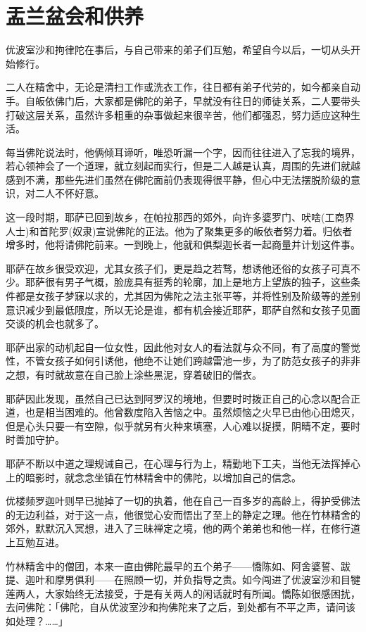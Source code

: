 \documentclass[12pt,twoside,openany]{book}
\begin{document}
\section{盂兰盆会和供养}\label{sec3.16}

优波室沙和拘律陀在事后，与自己带来的弟子们互勉，希望自今以后，一切从头开始修行。

二人在精舍中，无论是清扫工作或洗衣工作，往日都有弟子代劳的，如今都亲自动手。自皈依佛门后，大家都是佛陀的弟子，早就没有往日的师徒关系，二人要带头打破这层关系，虽然许多粗重的杂事做起来很辛苦，他们都强忍，努力适应这种生活。

每当佛陀说法时，他俩倾耳谛听，唯恐听漏一个字，因而往往进入了忘我的境界，若心领神会了一个道理，就立刻起而实行，但是二人越是认真，周围的先进们就越感到不满，那些先进们虽然在佛陀面前仍表现得很平静，但心中无法摆脱阶级的意识，对二人不怀好意。

这一段时期，耶萨已回到故乡，在帕拉那西的郊外，向许多婆罗门、吠啥(工商界人士)和首陀罗(奴隶)宣说佛陀的正法。他为了聚集更多的皈依者努力着。归依者增多时，他将请佛陀前来。一到晚上，他就和俱梨迦长者一起商量并计划这件事。

耶萨在故乡很受欢迎，尤其女孩子们，更是趋之若骛，想诱他还俗的女孩子可真不少。耶萨很有男子气概，脸庞具有挺秀的轮廓，加上是地方上望族的独子，这些条件都是女孩子梦寐以求的，尤其因为佛陀之法主张平等，并将性别及阶级等的差别意识减少到最低限度，所以无论是谁，都有机会接近耶萨，耶萨自然和女孩子见面交谈的机会也就多了。

耶萨出家的动机起自一位女性，因此他对女人的看法就与众不同，有了高度的警觉性，不管女孩子如何引诱他，他绝不让她们跨越雷池一步，为了防范女孩子的非非之想，有时就故意在自己脸上涂些黑泥，穿着破旧的僧衣。

耶萨因此发现，虽然自己已达到阿罗汉的境地，但要时时拨正自己的心念以配合正道，也是相当困难的。他曾数度陷入苦恼之中。虽然烦恼之火早已由他心田熄灭，但是心头只要一有空隙，似乎就另有火种来填塞，人心难以捉摸，阴晴不定，要时时善加守护。

耶萨不断以中道之理规诫自己，在心理与行为上，精勤地下工夫，当他无法挥掉心上的暗影时，就念念坐镇在竹林精舍中的佛陀，以增加自己的信念。

优楼频罗迦叶则早已抛掉了一切的执着，他在自己一百多岁的高龄上，得护受佛法的无边利益，对于这一点，他很觉心安而悟出了至上的静定之理。他在竹林精舍的郊外，默默沉入冥想，进入了三昧禅定之境，他的两个弟弟也和他一样，在修行道上互勉互进。

竹林精舍中的僧团，本来一直由佛陀最早的五个弟子——憍陈如、阿舍婆誓、跋提、迦叶和摩男俱利——在照顾一切，并负指导之责。如今闯进了优波室沙和目犍莲两人，大家始终无法接受，于是有关两人的闲话就时有所闻。憍陈如很感困扰，去问佛陀：「佛陀，自从优波室沙和拘佛陀来了之后，到处都有不平之声，请问该如处理？……」
\end{document}
